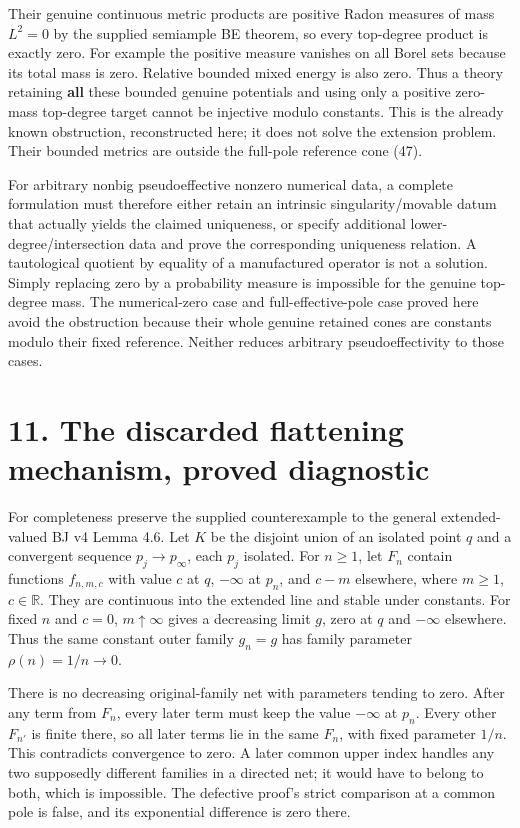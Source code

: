 \documentclass[
  10pt,
]{article}
\begin{document}
Their genuine continuous metric products are positive Radon measures of
mass \(L^2=0\) by the supplied semiample BE theorem, so every top-degree
product is exactly zero. For example the positive measure vanishes on
all Borel sets because its total mass is zero. Relative bounded mixed
energy is also zero. Thus a theory retaining \textbf{all} these bounded
genuine potentials and using only a positive zero-mass top-degree target
cannot be injective modulo constants. This is the already known
obstruction, reconstructed here; it does not solve the extension
problem. Their bounded metrics are outside the full-pole reference cone
(47).

For arbitrary nonbig pseudoeffective nonzero numerical data, a complete
formulation must therefore either retain an intrinsic
singularity/movable datum that actually yields the claimed uniqueness,
or specify additional lower-degree/intersection data and prove the
corresponding uniqueness relation. A tautological quotient by equality
of a manufactured operator is not a solution. Simply replacing zero by a
probability measure is impossible for the genuine top-degree mass. The
numerical-zero case and full-effective-pole case proved here avoid the
obstruction because their whole genuine retained cones are constants
modulo their fixed reference. Neither reduces arbitrary
pseudoeffectivity to those cases.

\section{11. The discarded flattening mechanism, proved
diagnostic}\label{the-discarded-flattening-mechanism-proved-diagnostic}

For completeness preserve the supplied counterexample to the general
extended-valued BJ v4 Lemma 4.6. Let \(K\) be the disjoint union of an
isolated point \(q\) and a convergent sequence \(p_j\to p_\infty\), each
\(p_j\) isolated. For \(n\geq1\), let \(F_n\) contain functions
\(f_{n,m,c}\) with value \(c\) at \(q\), \(-\infty\) at \(p_n\), and
\(c-m\) elsewhere, where \(m\geq1\), \(c\in\mathbb R\). They are
continuous into the extended line and stable under constants. For fixed
\(n\) and \(c=0\), \(m\uparrow\infty\) gives a decreasing limit \(g\),
zero at \(q\) and \(-\infty\) elsewhere. Thus the same constant outer
family \(g_n=g\) has family parameter \(\rho(n)=1/n\to0\).

There is no decreasing original-family net with parameters tending to
zero. After any term from \(F_n\), every later term must keep the value
\(-\infty\) at \(p_n\). Every other \(F_{n'}\) is finite there, so all
later terms lie in the same \(F_n\), with fixed parameter \(1/n\). This
contradicts convergence to zero. A later common upper index handles any
two supposedly different families in a directed net; it would have to
belong to both, which is impossible. The defective proof's strict
comparison at a common pole is false, and its exponential difference is
zero there.
\end{document}
